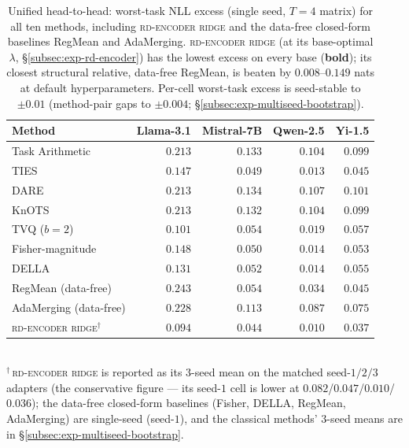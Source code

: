 \begin{table}[t]
\centering
\caption{Unified head-to-head: worst-task NLL excess (single seed,
$T = 4$ matrix) for all ten methods, including \textsc{rd-encoder
ridge} and the data-free closed-form baselines RegMean and AdaMerging.
\textsc{rd-encoder ridge} (at its base-optimal $\lambda$,
\S\ref{subsec:exp-rd-encoder}) has the lowest excess on every base
(\textbf{bold}); its closest structural relative, data-free RegMean, is
beaten by $0.008$--$0.149$ nats at default hyperparameters. Per-cell worst-task excess is
seed-stable to $\pm 0.01$ (method-pair gaps to $\pm 0.004$;
\S\ref{subsec:exp-multiseed-bootstrap}).}
\label{tab:e10-baselines}
\small
\begin{tabular}{lrrrr}
\hline
Method & Llama-3.1 & Mistral-7B & Qwen-2.5 & Yi-1.5 \\
\hline
Task Arithmetic           & $0.213$ & $0.133$ & $0.104$ & $0.099$ \\
TIES                      & $0.147$ & $0.049$ & $0.013$ & $0.045$ \\
DARE                      & $0.213$ & $0.134$ & $0.107$ & $0.101$ \\
KnOTS                     & $0.213$ & $0.132$ & $0.104$ & $0.099$ \\
TVQ ($b{=}2$)             & $0.101$ & $0.054$ & $0.019$ & $0.057$ \\
Fisher-magnitude          & $0.148$ & $0.050$ & $0.014$ & $0.053$ \\
DELLA                     & $0.131$ & $0.052$ & $0.014$ & $0.055$ \\
RegMean (data-free)       & $0.243$ & $0.054$ & $0.034$ & $0.045$ \\
AdaMerging (data-free)    & $0.228$ & $0.113$ & $0.087$ & $0.075$ \\
\textsc{rd-encoder ridge}$^\dagger$ & $\mathbf{0.094}$ & $\mathbf{0.044}$ & $\mathbf{0.010}$ & $\mathbf{0.037}$ \\
\hline
\end{tabular}
\\[2pt]
\footnotesize
$^\dagger$\,\textsc{rd-encoder ridge} is reported as its $3$-seed mean on the
matched seed-$1/2/3$ adapters (the conservative figure --- its seed-$1$ cell is
lower at $0.082$/$0.047$/$0.010$/$0.036$); the data-free closed-form baselines
(Fisher, DELLA, RegMean, AdaMerging) are single-seed (seed-$1$), and the
classical methods' $3$-seed means are in \S\ref{subsec:exp-multiseed-bootstrap}.
\end{table}

